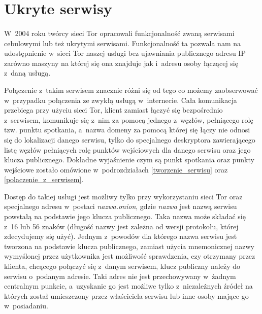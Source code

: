 \section{Ukryte serwisy}\paragraph{}
W~2004 roku twórcy sieci Tor opracowali funkcjonalność zwaną serwisami cebulowymi lub też ukrytymi serwisami. Funkcjonalność ta pozwala nam na udostępnienie w~sieci Tor naszej usługi bez ujawniania publicznego adresu IP zarówno maszyny na której się ona znajduje jak i~adresu osoby łączącej się z~daną usługą\cite{tor_design}.

Połączenie z~takim serwisem znacznie różni się od tego co możemy zaobserwować w~przypadku połączenia ze zwykłą usługą w~internecie. Cała komunikacja przebiega przy użyciu sieci Tor, klient zamiast łączyć się bezpośrednio z~serwisem, komunikuje się z~nim za pomocą jednego z~węzłów, pełniącego rolę tzw. punktu spotkania, a~nazwa domeny za pomocą której się łączy nie odnosi się do lokalizacji danego serwisu, tylko do specjalnego deskryptora zawierającego listę węzłów pełniących rolę punktów wejściowych dla danego serwisu oraz jego klucza publicznego\cite{torproject_services}. Dokładne wyjaśnienie czym są punkt spotkania oraz punkty wejściowe zostało omówione w~podrozdziałach \ref{tworzenie_serwisu} oraz \ref{polaczenie_z_serwisem}.

Dostęp do takiej usługi jest możliwy tylko przy wykorzystaniu sieci Tor oraz specjalnego adresu w~postaci \textit{nazwa.onion}, gdzie \textit{nazwa} jest nazwą serwisu powstałą na podstawie jego klucza publicznego. Taka nazwa może składać się z~16 lub 56 znaków (długość nazwy jest zależna od wersji protokołu, której zdecydujemy się użyć)\cite{hs_names1}. Jednym z~powodów dla którego nazwa serwisu jest tworzona na podstawie klucza publicznego, zamiast użycia mnemonicznej nazwy wymyślonej przez użytkownika jest możliwość sprawdzenia, czy otrzymany przez klienta, chcącego połączyć się z~danym serwisem, klucz publiczny należy do serwisu o~podanym adresie\cite{hs_names2}. Taki adres nie jest przechowywany w~żadnym centralnym punkcie, a~uzyskanie go jest możliwe tylko z~niezależnych źródeł na których został umieszczony przez właściciela serwisu lub inne osoby mające go w~posiadaniu\cite{torproject_services}.

